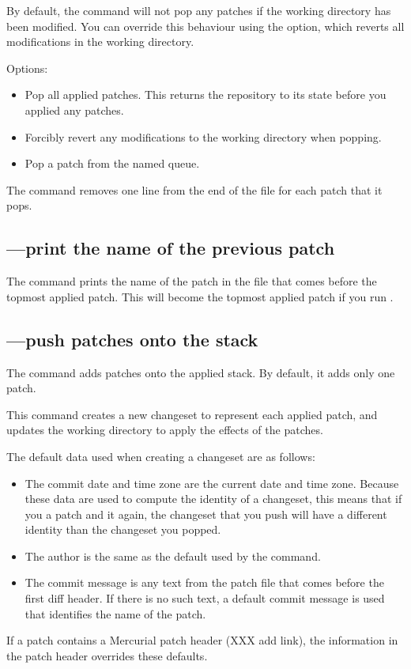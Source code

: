 By default, the  command will not pop any patches if the
working directory has been modified.  You can override this behaviour
using the  option, which reverts all modifications in
the working directory.

Options:
\begin{itemize}
\item[\hgxopt{mq}{qpop}{-a}] Pop all applied patches.  This returns the
  repository to its state before you applied any patches.
\item[\hgxopt{mq}{qpop}{-f}] Forcibly revert any modifications to the
  working directory when popping.
\item[\hgxopt{mq}{qpop}{-n}] Pop a patch from the named queue.
\end{itemize}

The  command removes one line from the end of the
 file for each patch that it pops.

\subsection{---print the name of the previous patch}

The  command prints the name of the patch in the
 file that comes before the topmost applied patch.
This will become the topmost applied patch if you run .

\subsection{---push patches onto the stack}
\label{sec:mqref:cmd:qpush}

The  command adds patches onto the applied stack.  By
default, it adds only one patch.

This command creates a new changeset to represent each applied patch,
and updates the working directory to apply the effects of the patches.

The default data used when creating a changeset are as follows:
\begin{itemize}
\item The commit date and time zone are the current date and time
  zone.  Because these data are used to compute the identity of a
  changeset, this means that if you  a patch and
   it again, the changeset that you push will have a
  different identity than the changeset you popped.
\item The author is the same as the default used by the 
  command.
\item The commit message is any text from the patch file that comes
  before the first diff header.  If there is no such text, a default
  commit message is used that identifies the name of the patch.
\end{itemize}
If a patch contains a Mercurial patch header (XXX add link), the
information in the patch header overrides these defaults.

